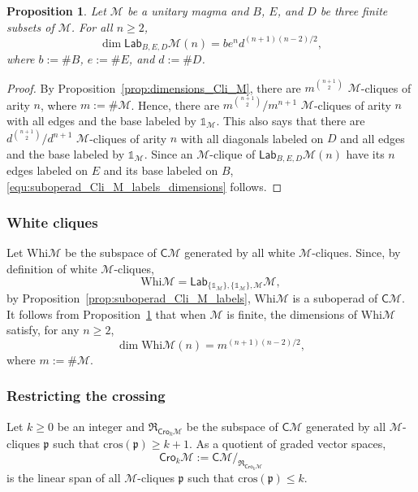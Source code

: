 \documentclass[10pt,reqno]{amsart}
\numberwithin{equation}{subsection}
\renewcommand{\leq}{\leqslant}
\renewcommand{\geq}{\geqslant}
\newtheorem{Proposition}[Theorem]{Proposition}
\newcommand{\Mca}{\mathcal{M}}
\newcommand{\Pfr}{\mathfrak{p}}
\newcommand{\Cli}{\mathsf{C}}
\newcommand{\Lab}{\mathsf{Lab}}
\newcommand{\Cro}{\mathsf{Cro}}
\newcommand{\Whi}{\mathrm{Whi}}
\newcommand{\Unit}{\mathds{1}}
\newcommand{\Rel}{\mathfrak{R}}
\newcommand{\Cros}{\mathrm{cros}}
\begin{document}
\begin{Proposition} \label{prop:suboperad_Cli_M_labels_dimensions}
    Let $\Mca$ be a unitary magma and $B$, $E$, and $D$ be three
    finite subsets of $\Mca$. For all $n \geq 2$,
    \begin{equation} \label{equ:suboperad_Cli_M_labels_dimensions}
        \dim \Lab_{B, E, D}\Mca(n) =
         b e^n d^{(n + 1)(n - 2) / 2},
    \end{equation}
    where $b := \# B$, $e := \# E$, and $d := \# D$.
\end{Proposition}
\begin{proof}
    By Proposition~\ref{prop:dimensions_Cli_M}, there are
    $m^{\binom{n + 1}{2}}$ $\Mca$-cliques of arity $n$, where
    $m := \# \Mca$. Hence, there are
    $m^{\binom{n + 1}{2}} / m^{n + 1}$ $\Mca$-cliques of arity $n$ with
    all edges and the base labeled by $\Unit_\Mca$. This also says that
    there are $d^{\binom{n + 1}{2}} / d^{n + 1}$ $\Mca$-cliques of arity
    $n$ with all diagonals labeled on $D$ and all edges and the base
    labeled by $\Unit_\Mca$. Since an $\Mca$-clique of
    $\Lab_{B, E, D}\Mca(n)$ have its $n$ edges labeled on $E$ and its
    base labeled on $B$, \eqref{equ:suboperad_Cli_M_labels_dimensions}
    follows.
\end{proof}
\medskip

\subsubsection{White cliques}%
\label{subsubsec:suboperad_Cli_M_white}
Let $\Whi\Mca$ be the subspace of $\Cli\Mca$ generated by all white
$\Mca$-cliques. Since, by definition of white $\Mca$-cliques,
\begin{equation}
    \Whi\Mca = \Lab_{\{\Unit_\Mca\}, \{\Unit_\Mca\}, \Mca}\Mca,
\end{equation}
by Proposition~\ref{prop:suboperad_Cli_M_labels}, $\Whi\Mca$ is a
suboperad of $\Cli\Mca$. It follows from
Proposition~\ref{prop:suboperad_Cli_M_labels_dimensions} that when
$\Mca$ is finite, the dimensions of $\Whi\Mca$ satisfy, for any
$n \geq 2$,
\begin{equation}
    \dim \Whi\Mca(n) =
    m^{(n + 1)(n - 2) / 2},
\end{equation}
where $m := \# \Mca$.
\medskip

\subsubsection{Restricting the crossing}%
\label{subsubsec:quotient_Cli_M_crossings}
Let $k \geq 0$ be an integer and $\Rel_{\Cro_k\Mca}$ be the subspace of
$\Cli\Mca$ generated by all $\Mca$-cliques $\Pfr$ such that
$\Cros(\Pfr) \geq k + 1$. As a quotient of graded vector spaces,
\begin{equation}
    \Cro_k\Mca := \Cli\Mca/_{\Rel_{\Cro_k\Mca}}
\end{equation}
is the linear span of all $\Mca$-cliques $\Pfr$ such that
$\Cros(\Pfr) \leq k$.
\medskip
\end{document}
